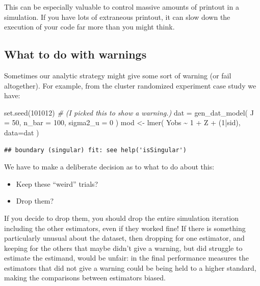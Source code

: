 \documentclass[
]{book}
\newenvironment{Shaded}{\begin{snugshade}}{\end{snugshade}}
\newcommand{\AttributeTok}[1]{\textcolor[rgb]{0.77,0.63,0.00}{#1}}
\newcommand{\CommentTok}[1]{\textcolor[rgb]{0.56,0.35,0.01}{\textit{#1}}}
\newcommand{\DecValTok}[1]{\textcolor[rgb]{0.00,0.00,0.81}{#1}}
\newcommand{\FunctionTok}[1]{\textcolor[rgb]{0.00,0.00,0.00}{#1}}
\newcommand{\NormalTok}[1]{#1}
\newcommand{\OtherTok}[1]{\textcolor[rgb]{0.56,0.35,0.01}{#1}}
\newcommand{\SpecialCharTok}[1]{\textcolor[rgb]{0.00,0.00,0.00}{#1}}
\providecommand{\tightlist}{%
  \setlength{\itemsep}{0pt}\setlength{\parskip}{0pt}}
\begin{document}
This can be especially valuable to control massive amounts of printout in a simulation. If you have lots of extraneous printout, it can slow down the execution of your code far more than you might think.

\hypertarget{what-to-do-with-warnings}{%
\subsection{What to do with warnings}\label{what-to-do-with-warnings}}

Sometimes our analytic strategy might give some sort of warning (or fail altogether).
For example, from the cluster randomized experiment case study we have:

\begin{Shaded}
\begin{Highlighting}[]
\FunctionTok{set.seed}\NormalTok{(}\DecValTok{101012}\NormalTok{)  }\CommentTok{\# (I picked this to show a warning.)}
\NormalTok{dat }\OtherTok{=} \FunctionTok{gen\_dat\_model}\NormalTok{( }\AttributeTok{J =} \DecValTok{50}\NormalTok{, }\AttributeTok{n\_bar =} \DecValTok{100}\NormalTok{, }\AttributeTok{sigma2\_u =} \DecValTok{0}\NormalTok{ )}
\NormalTok{mod }\OtherTok{\textless{}{-}} \FunctionTok{lmer}\NormalTok{( Yobs }\SpecialCharTok{\textasciitilde{}} \DecValTok{1} \SpecialCharTok{+}\NormalTok{ Z }\SpecialCharTok{+}\NormalTok{ (}\DecValTok{1}\SpecialCharTok{|}\NormalTok{sid), }\AttributeTok{data=}\NormalTok{dat )}
\end{Highlighting}
\end{Shaded}

\begin{verbatim}
## boundary (singular) fit: see help('isSingular')
\end{verbatim}

We have to make a deliberate decision as to what to do about this:

\begin{itemize}
\tightlist
\item
  Keep these ``weird'' trials?
\item
  Drop them?
\end{itemize}

If you decide to drop them, you should drop the entire simulation iteration including the other estimators, even if they worked fine!
If there is something particularly unusual about the dataset, then dropping for one estimator, and keeping for the others that maybe didn't give a warning, but did struggle to estimate the estimand, would be unfair: in the final performance measures the estimators that did not give a warning could be being held to a higher standard, making the comparisons between estimators biased.
\end{document}
